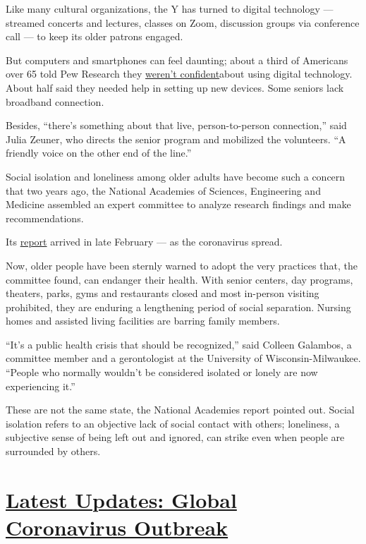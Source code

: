 Like many cultural organizations, the Y has turned to digital technology
--- streamed concerts and lectures, classes on Zoom, discussion groups
via conference call --- to keep its older patrons engaged.

But computers and smartphones can feel daunting; about a third of
Americans over 65 told Pew Research they
\href{https://www.pewresearch.org/internet/2017/05/17/barriers-to-adoption-and-attitudes-towards-technology/}{weren't
confident}about using digital technology. About half said they needed
help in setting up new devices. Some seniors lack broadband connection.

Besides, ``there's something about that live, person-to-person
connection,'' said Julia Zeuner, who directs the senior program and
mobilized the volunteers. ``A friendly voice on the other end of the
line.''

Social isolation and loneliness among older adults have become such a
concern that two years ago, the National Academies of Sciences,
Engineering and Medicine assembled an expert committee to analyze
research findings and make recommendations.

Its
\href{https://www.nationalacademies.org/our-work/the-health-and-medical-dimensions-of-social-isolation-and-loneliness-in-older-adults}{report}
arrived in late February --- as the coronavirus spread.

Now, older people have been sternly warned to adopt the very practices
that, the committee found, can endanger their health. With senior
centers, day programs, theaters, parks, gyms and restaurants closed and
most in-person visiting prohibited, they are enduring a lengthening
period of social separation. Nursing homes and assisted living
facilities are barring family members.

``It's a public health crisis that should be recognized,'' said Colleen
Galambos, a committee member and a gerontologist at the University of
Wisconsin-Milwaukee. ``People who normally wouldn't be considered
isolated or lonely are now experiencing it.''

These are not the same state, the National Academies report pointed out.
Social isolation refers to an objective lack of social contact with
others; loneliness, a subjective sense of being left out and ignored,
can strike even when people are surrounded by others.

\hypertarget{latest-updates-global-coronavirus-outbreak}{%
\section{\texorpdfstring{\href{https://www.nytimes3xbfgragh.onion/2020/08/01/world/coronavirus-covid-19.html?action=click\&pgtype=Article\&state=default\&region=MAIN_CONTENT_1\&context=storylines_live_updates}{Latest
Updates: Global Coronavirus
Outbreak}}{Latest Updates: Global Coronavirus Outbreak}}\label{latest-updates-global-coronavirus-outbreak}}

